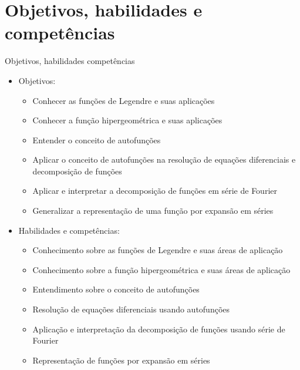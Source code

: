 \section[slide=true]{Objetivos, habilidades e competências}
      \begin{slide}[toc=]{Objetivos, habilidades competências}
         \begin{itemize}
            \item Objetivos:
		    \begin{itemize}
			    \item Conhecer as funções de Legendre e suas aplicações
			    \item Conhecer a função hipergeométrica e suas aplicações
			    \item Entender o conceito de autofunções
			    \item Aplicar o conceito de autofunções na resolução de equações diferenciais e decomposição de funções
			    \item Aplicar e interpretar a decomposição de funções em série de Fourier
			    \item Generalizar a representação de uma função por expansão em séries
		    \end{itemize}
	     \item Habilidades e competências:
		     \begin{itemize}
			     \item Conhecimento sobre as funções de Legendre e suas áreas de aplicação
			     \item Conhecimento sobre a função hipergeométrica e suas áreas de aplicação
			     \item Entendimento sobre o conceito de autofunções
			     \item Resolução de equações diferenciais usando autofunções
			     \item Aplicação e interpretação da decomposição de funções usando série de Fourier
			     \item Representação de funções por expansão em séries
	            \end{itemize}
         \end{itemize}
      \end{slide}

